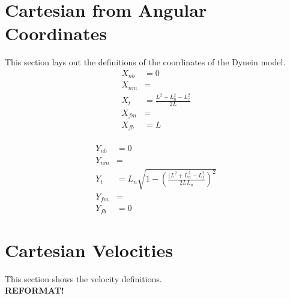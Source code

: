 \documentclass[11pt, landscape]{article}
\begin{document}
\section{Cartesian from Angular Coordinates}
This section lays out the definitions of the coordinates of the Dynein model. \\
\begin{align}
  X_{nb} &= 0 \\
  X_{nm} &=  \\
  X_{t}  &= \frac{L^2+L_n^2-L_f^2}{2L} \\
  X_{fm} &=  \\
  X_{fb} &= L \\
\end{align}

\begin{align}
  Y_{nb} &= 0 \\
  Y_{nm} &=  \\
  Y_{t}  &= L_n\sqrt{1 - \left(\frac{(L^2+L_n^2-L_f^2}{2LL_n}\right)^2} \\
  Y_{fm} &=  \\
  Y_{fb} &= 0
\end{align}

\section{Cartesian Velocities}
This section shows the velocity definitions. \\

\textbf{REFORMAT!}
\end{document}
